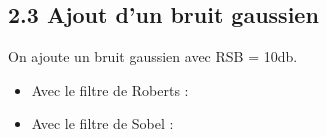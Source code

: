 \documentclass{article}
\begin{document}
\subsection*{2.3 Ajout d'un bruit gaussien}
On ajoute un bruit gaussien avec RSB = 10db.
\begin{itemize}\renewcommand{\labelitemi}{$\bullet$}
	\item Avec le filtre de Roberts :

\begin{center}
\end{center}

	\item Avec le filtre de Sobel :

\begin{center}
\end{center}

\end{itemize}
\end{document}
